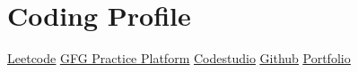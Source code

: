 \documentclass[letterpaper,11pt]{article}
\begin{document}
\section{Coding Profile}
\begin{center}
    \href{https://leetcode.com/u/keshavop/}{\underline{Leetcode}} \quad
    \href{https://www.geeksforgeeks.org/user/keshavop/}{\underline{GFG Practice Platform}} \quad
    \href{https://www.codingninjas.com/codestudio/profile/keshavop}{\underline{Codestudio}} \quad
    \href{https://github.com/keshavop}{\underline{Github}} \quad
    \href{https://keshavop.in}{\underline{Portfolio}} \quad
\end{center}
\vspace{-12pt}
\end{document}
